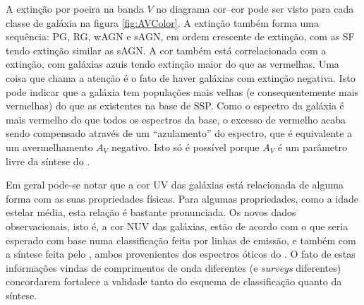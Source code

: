 A extinção por poeira na banda $V$ no diagrama cor--cor pode ser visto para cada
classe de galáxia na figura \ref{fig:AVColor}. A extinção também forma uma
sequência: PG, RG, wAGN e sAGN, em ordem crescente de extinção, com as SF tendo
extinção similar as sAGN. A cor também está correlacionada com a extinção, com
galáxias azuis tendo extinção maior do que as vermelhas. Uma coisa que chama a
atenção é o fato de haver galáxias com extinção negativa. Isto pode indicar que
a galáxia tem populações mais velhas (e consequentemente mais vermelhas) do que
as existentes na base de SSP. Como o espectro da galáxia é mais vermelho do que
todos os espectros da base, o excesso de vermelho acaba sendo compensado através
de um ``azulamento'' do espectro, que é equivalente a um avermelhamento $A_V$
negativo. Isto só é possível porque $A_V$ é um parâmetro livre da síntese do
\starlight.

Em geral pode-se notar que a cor UV das galáxias está relacionada de alguma
forma com as suas propriedades físicas. Para algumas propriedades, como a idade
estelar média, esta relação é bastante pronunciada. Os novos dados
observacionais, isto é, a cor NUV das galáxias, estão de acordo com o que seria
esperado com base numa classificação feita por linhas de emissão, e também com a
síntese feita pelo \starlight, ambos provenientes dos espectros óticos do \SDSS.
O fato de estas informações vindas de comprimentos de onda diferentes (e {\em
surveys} diferentes) concordarem fortalece a validade tanto do esquema de
classificação quanto da síntese.

